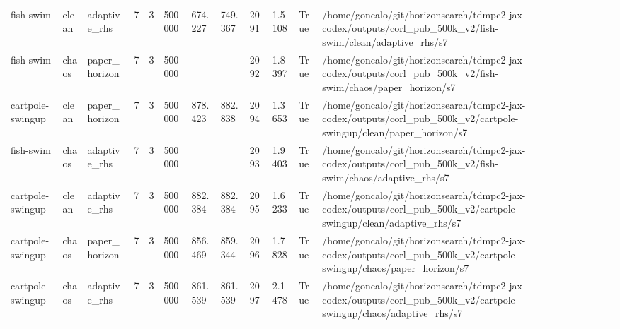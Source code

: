 \begin{tabular}{llllllllllll}
fish-swim & clean & adaptive\_rhs & 7 & 3 & 500000 & 674.227 & 749.367 & 2091 & 1.5108 & True & /home/goncalo/git/horizonsearch/tdmpc2-jax-codex/outputs/corl\_pub\_500k\_v2/fish-swim/clean/adaptive\_rhs/s7 \\
fish-swim & chaos & paper\_horizon & 7 & 3 & 500000 &  &  & 2092 & 1.8397 & True & /home/goncalo/git/horizonsearch/tdmpc2-jax-codex/outputs/corl\_pub\_500k\_v2/fish-swim/chaos/paper\_horizon/s7 \\
cartpole-swingup & clean & paper\_horizon & 7 & 3 & 500000 & 878.423 & 882.838 & 2094 & 1.3653 & True & /home/goncalo/git/horizonsearch/tdmpc2-jax-codex/outputs/corl\_pub\_500k\_v2/cartpole-swingup/clean/paper\_horizon/s7 \\
fish-swim & chaos & adaptive\_rhs & 7 & 3 & 500000 &  &  & 2093 & 1.9403 & True & /home/goncalo/git/horizonsearch/tdmpc2-jax-codex/outputs/corl\_pub\_500k\_v2/fish-swim/chaos/adaptive\_rhs/s7 \\
cartpole-swingup & clean & adaptive\_rhs & 7 & 3 & 500000 & 882.384 & 882.384 & 2095 & 1.6233 & True & /home/goncalo/git/horizonsearch/tdmpc2-jax-codex/outputs/corl\_pub\_500k\_v2/cartpole-swingup/clean/adaptive\_rhs/s7 \\
cartpole-swingup & chaos & paper\_horizon & 7 & 3 & 500000 & 856.469 & 859.344 & 2096 & 1.7828 & True & /home/goncalo/git/horizonsearch/tdmpc2-jax-codex/outputs/corl\_pub\_500k\_v2/cartpole-swingup/chaos/paper\_horizon/s7 \\
cartpole-swingup & chaos & adaptive\_rhs & 7 & 3 & 500000 & 861.539 & 861.539 & 2097 & 2.1478 & True & /home/goncalo/git/horizonsearch/tdmpc2-jax-codex/outputs/corl\_pub\_500k\_v2/cartpole-swingup/chaos/adaptive\_rhs/s7 \\
\bottomrule
\end{tabular}
